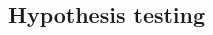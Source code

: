 \begin{spacing}{1.5}

\section[Hypothesis testing]{Hypothesis testing} %
\label{hypothesisTesting}


\end{spacing}
